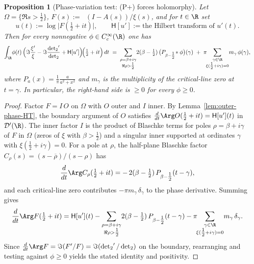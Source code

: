 \documentclass[11pt]{article}
\newtheorem{proposition}[theorem]{Proposition}
\theoremstyle{remark}
\DeclareMathOperator{\dettwo}{det_2}
\begin{document}
\begin{proposition}[Phase-variation test: (P+) forces holomorphy]\label{prop:Pplus-holomorphy}
Let \(\Omega=\{\Re s>\tfrac12\}\), \(F(s):=\dettwo(I-A(s))/\xi(s)\), and for \(t\in\R\) set
\[
 u(t):=\log\big|F(\tfrac12+it)\big|,\qquad
 \mathsf H[u']:=\text{the Hilbert transform of }u'(t).
\]
Then for every nonnegative \(\phi\in C_c^\infty(\R)\) one has
\[
\int_{\R}\!\phi(t)\,\Big(\Im\frac{\xi'}{\xi}-\Im\frac{\dettwo'}{\dettwo}+\mathsf H[u']\Big)\!\Big(\tfrac12+it\Big)\,dt
\;=\;\sum_{\substack{\rho=\beta+i\gamma\\ \Re\rho>\tfrac12}}\! 2(\beta-\tfrac12)\,\big(P_{\beta-\tfrac12}\!\ast\phi\big)(\gamma)
\; +\; \pi\!\!\sum_{\substack{\gamma\in\R\\ \xi(\tfrac12+i\gamma)=0}}\! m_\gamma\,\phi(\gamma),
\]
where \(P_a(x)=\frac{1}{\pi}\frac{a}{a^2+x^2}\) and \(m_\gamma\) is the multiplicity of the critical-line zero at \(t=\gamma\). In particular, the right-hand side is \(\ge 0\) for every \(\phi\ge 0\).
\end{proposition}
\begin{proof}
Factor \(F=I\,O\) on \(\Omega\) with \(O\) outer and \(I\) inner. By Lemma~\ref{lem:outer-phase-HT}, the boundary argument of \(O\) satisfies \(\frac{d}{dt}\Arg O(\tfrac12+it)=\mathsf H[u'](t)\) in \(\mathcal D'(\R)\). The inner factor \(I\) is the product of Blaschke terms for poles \(\rho=\beta+i\gamma\) of \(F\) in \(\Omega\) (zeros of \(\xi\) with \(\beta>\tfrac12\)) and a singular inner supported at ordinates \(\gamma\) with \(\xi(\tfrac12+i\gamma)=0\). For a pole at \(\rho\), the half-plane Blaschke factor \(C_\rho(s)=(s-\overline\rho)/(s-\rho)\) has
\[
\frac{d}{dt}\Arg C_\rho(\tfrac12+it)=-\,2(\beta-\tfrac12)\,P_{\beta-\tfrac12}(t-\gamma),
\]
and each critical-line zero contributes \(-\pi m_\gamma\,\delta_\gamma\) to the phase derivative. Summing gives
\[
\frac{d}{dt}\Arg F(\tfrac12+it)=\mathsf H[u'](t)
-\sum_{\substack{\rho=\beta+i\gamma\\ \Re\rho>\tfrac12}}\! 2(\beta-\tfrac12)\,P_{\beta-\tfrac12}(t-\gamma)
-\pi\!\!\sum_{\substack{\gamma\in\R\\ \xi(\tfrac12+i\gamma)=0}}\! m_\gamma\,\delta_\gamma.
\]
Since \(\frac{d}{dt}\Arg F=\Im(F'/F)=\Im(\dettwo'/\dettwo)\) on the boundary, rearranging and testing against \(\phi\ge 0\) yields the stated identity and positivity.
\end{proof}
\end{document}
